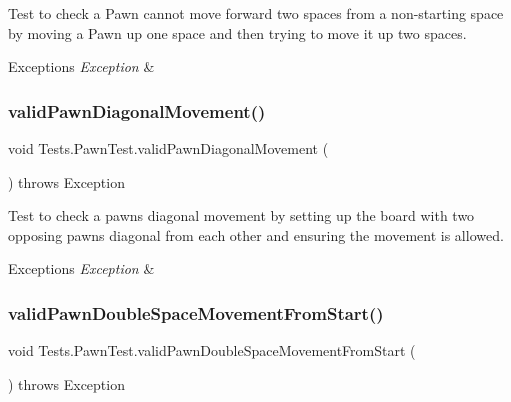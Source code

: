 Test to check a Pawn cannot move forward two spaces from a non-\/starting space by moving a Pawn up one space and then trying to move it up two spaces. 
\begin{DoxyExceptions}{Exceptions}
{\em Exception} & \\
\hline
\end{DoxyExceptions}
\hypertarget{class_tests_1_1_pawn_test_aee76762875ad44ca3a078618467f4e87}{}\label{class_tests_1_1_pawn_test_aee76762875ad44ca3a078618467f4e87} 
\subsubsection{\texorpdfstring{valid\+Pawn\+Diagonal\+Movement()}{validPawnDiagonalMovement()}}
{\footnotesize\ttfamily void Tests.\+Pawn\+Test.\+valid\+Pawn\+Diagonal\+Movement (\begin{DoxyParamCaption}{ }\end{DoxyParamCaption}) throws Exception}

Test to check a pawn\textquotesingle{}s diagonal movement by setting up the board with two opposing pawns diagonal from each other and ensuring the movement is allowed. 
\begin{DoxyExceptions}{Exceptions}
{\em Exception} & \\
\hline
\end{DoxyExceptions}
\hypertarget{class_tests_1_1_pawn_test_a609983048db9ea8be85c1a0eca1a4c64}{}\label{class_tests_1_1_pawn_test_a609983048db9ea8be85c1a0eca1a4c64} 
\subsubsection{\texorpdfstring{valid\+Pawn\+Double\+Space\+Movement\+From\+Start()}{validPawnDoubleSpaceMovementFromStart()}}
{\footnotesize\ttfamily void Tests.\+Pawn\+Test.\+valid\+Pawn\+Double\+Space\+Movement\+From\+Start (\begin{DoxyParamCaption}{ }\end{DoxyParamCaption}) throws Exception}

